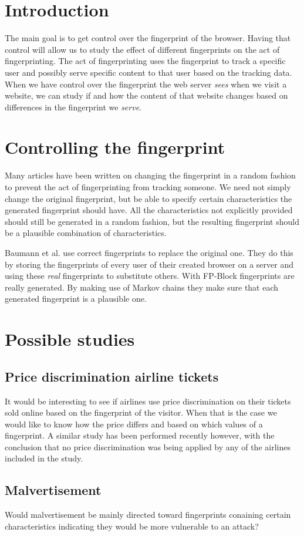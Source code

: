 \section{Introduction}

The main goal is to get control over the fingerprint of the browser.
Having that control will allow us
to study the effect of different fingerprints
on the act of fingerprinting.
The act of fingerprinting uses the fingerprint
to track a specific user
and possibly serve specific content to that user
based on the tracking data.
When we have control over the fingerprint the web server \emph{sees}
when we visit a website,
we can study if and how the content of that website changes
based on differences in the fingerprint we \emph{serve}.

\section{Controlling the fingerprint}

Many articles have been written on changing the fingerprint in a random fashion
to prevent the act of fingerprinting from tracking someone.
We need not simply change the original fingerprint,
but be able to specify certain characteristics
the generated fingerprint should have.
All the characteristics not explicitly provided
should still be generated in a random fashion,
but the resulting fingerprint
should be a plausible combination of characteristics.

Baumann et al. use correct fingerprints to replace the original one.
\citep{baumann2016disguised}
They do this by storing the fingerprints
of every user of their created browser
on a server and using these \emph{real} fingerprints to substitute others.
With FP-Block fingerprints are really generated.
\citep{torres2015fp-block:}
By making use of Markov chains they make sure
that each generated fingerprint is a plausible one.

\section{Possible studies}

\subsection{Price discrimination airline tickets}

It would be interesting to see if airlines use price discrimination
on their tickets sold online based on the fingerprint of the visitor.
When that is the case we would like to know
how the price differs and based on which values of a fingerprint.
A similar study has been performed recently however,
with the conclusion that no price discrimination was being applied
by any of the airlines included in the study.
\citep{vissers2014crying}

\subsection{Malvertisement}

Would malvertisement be mainly directed toward
fingerprints conaining certain characteristics
indicating they would be more vulnerable to an attack?
